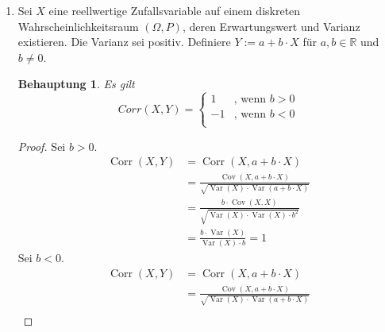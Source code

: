 \documentclass[a4paper]{scrartcl}
\newtheorem*{behaupt}{Behauptung}
\newcommand{\cov}{\operatorname{Cov}}
\newcommand{\var}{\operatorname{Var}}
\newcommand{\corr}{\operatorname{Corr}}
\begin{document}
\begin{enumerate}[label=\bfseries\arabic*.]
\begin{enumerate}[label=(\alph*)]
            \item
                Sei $X$ eine reellwertige Zufallsvariable auf einem diskreten
                Wahrscheinlichkeitsraum $(\Omega, P)$, deren Erwartungswert und
                Varianz existieren.
                Die Varianz sei positiv.
                Definiere $Y := a + b \cdot X$ für $a, b \in \mathbb{R}$ und
                $b \neq 0$.
                \begin{behaupt}
                    Es gilt
                    \begin{equation*}
                        Corr(X, Y) =
                        \begin{cases}
                             1 & \text{, wenn } b > 0 \\
                            -1 & \text{, wenn } b < 0 \\
                        \end{cases}
                    \end{equation*}
                \end{behaupt}
                \begin{proof}
                    Sei $b > 0$.
                    \begin{equation*}
                        \begin{split}
                            \corr(X,Y)
                            &= \corr(X, a + b \cdot X) \\
                            &= \frac{\cov(X, a + b \cdot X)}
                            {\sqrt{\var(X) \cdot \var(a + b \cdot X)}} \\
                            &= \frac{b \cdot \cov(X, X)}
                            {\sqrt{\var(X) \cdot \var(X) \cdot b^2}} \\
                            &= \frac{b \cdot \var(X)}
                            {\var(X) \cdot b} = 1
                        \end{split}
                    \end{equation*}
                    Sei $b < 0$.
                    \begin{equation*}
                        \begin{split}
                            \corr(X,Y)
                            &= \corr(X, a + b \cdot X) \\
                            &= \frac{\cov(X, a + b \cdot X)}
                            {\sqrt{\var(X) \cdot \var(a + b \cdot X)}} \\

\end{split}
\end{equation*}
\end{proof}
\end{enumerate}
\end{enumerate}
\end{document}
